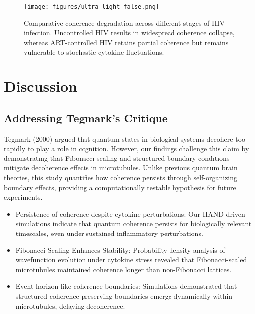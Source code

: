 \documentclass[entropy,article,submit,oneauthor,pdftex]{Definitions/mdpi}
\begin{document}
\begin{figure}[H]
    \centering
    \texttt{[image: figures/ultra\_light\_false.png]}
    \caption{Comparative coherence degradation across different stages of HIV infection. Uncontrolled HIV results in widespread coherence collapse, whereas ART-controlled HIV retains partial coherence but remains vulnerable to stochastic cytokine fluctuations.}
    \label{fig:HIV_coherence_stages}
\end{figure}

\FloatBarrier  %

\section{Discussion}
\subsection{Addressing Tegmark's Critique}
Tegmark (2000) argued that quantum states in biological systems decohere too rapidly to play a role in cognition. However, our findings challenge this claim by demonstrating that Fibonacci scaling and structured boundary conditions mitigate decoherence effects in microtubules. Unlike previous quantum brain theories, this study quantifies how coherence persists through self-organizing boundary effects, providing a computationally testable hypothesis for future experiments.
\begin{itemize}
    \item Persistence of coherence despite cytokine perturbations: Our HAND-driven simulations indicate that quantum coherence persists for biologically relevant timescales, even under sustained inflammatory perturbations.
    \item Fibonacci Scaling Enhances Stability: Probability density analysis of wavefunction evolution under cytokine stress revealed that Fibonacci-scaled microtubules maintained coherence longer than non-Fibonacci lattices.
    \item Event-horizon-like coherence boundaries: Simulations demonstrated that structured coherence-preserving boundaries emerge dynamically within microtubules, delaying decoherence.
\end{itemize}
\end{document}
